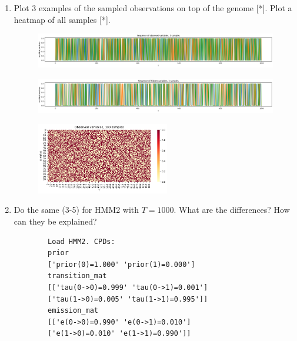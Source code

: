 \documentclass[a4 paper]{article}
\begin{document}
\begin{enumerate}
    
    \item Plot 3 examples of the sampled observations on top of the genome [*]. Plot a heatmap of all samples [*].
    \begin{figure}[H]
        \centering
        \includegraphics[width=\textwidth]{../plots/Q2_hmm1_sequence_observed.png}
    \end{figure}
    \begin{figure}[H]
        \centering
        \includegraphics[width=\textwidth]{../plots/Q2_hmm1_sequence_hidden.png}
    \end{figure}    
    \begin{figure}[H]
        \centering
        \includegraphics[width=0.55\textwidth]{../plots/Q2_hmm1_heatmap_observed.png}
    \end{figure}

    
    \item Do the same (3-5) for HMM2 with \( T = 1000 \). What are the differences? How can they be explained?
    \\
    \begin{verbatim}
        Load HMM2. CPDs:
        prior
        ['prior(0)=1.000' 'prior(1)=0.000']
        transition_mat
        [['tau(0->0)=0.999' 'tau(0->1)=0.001']
        ['tau(1->0)=0.005' 'tau(1->1)=0.995']]
        emission_mat
        [['e(0->0)=0.990' 'e(0->1)=0.010']
        ['e(1->0)=0.010' 'e(1->1)=0.990']]
    \end{verbatim}


\end{enumerate}
\end{document}
